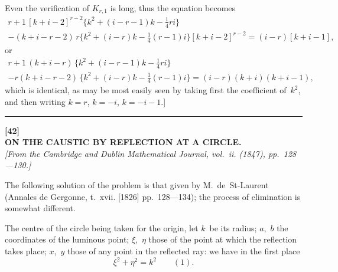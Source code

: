 \documentclass[11pt,a4paper]{book}
\begin{document}
Even the verification of $K_{r,1}$ is long, thus the equation becomes
\begin{multline*}
r+1 \, [k+i-2]^{r-2} \{k^2 + (i-r-1)k - \tfrac{1}{4}ri\} \\
- (k+i-r-2)\,r\{k^2 + (i-r)k - \tfrac{1}{4}(r-1)i\}[k+i-2]^{r-2} = (i-r)[k+i-1],
\end{multline*}
or
\begin{multline*}
r+1 \, (k+i-r)\,\{k^2 + (i-r-1)k - \tfrac{1}{4}ri\} \\
- r(k+i-r-2)\,\{k^2 + (i-r)k - \tfrac{1}{4}(r-1)i\} = (i-r)(k+i)(k+i-1),
\end{multline*}
which is identical, as may be most easily seen by taking first the coefficient of~$k^2$, and then writing $k=r$, $k=-i$, $k=-i-1$.]
\normalsize

\vspace{20pt}
\begin{center}
\rule{0.5\textwidth}{0.4pt}
\end{center}


\newpage
\begin{center}
\textbf{[42]}\\[4pt]
\textbf{\large ON THE CAUSTIC BY REFLECTION AT A CIRCLE.}\\[4pt]
\textit{[From the Cambridge and Dublin Mathematical Journal, vol.~ii. (1847), pp.~128---130.]}
\end{center}

\vspace{6pt}

The following solution of the problem is that given by M.~de~St-Laurent (Annales de Gergonne, t.~xvii. [1826] pp.~128---134); the process of elimination is somewhat different.

The centre of the circle being taken for the origin, let $k$~be its radius; $a$,~$b$ the coordinates of the luminous point; $\xi$,~$\eta$ those of the point at which the reflection takes place; $x$,~$y$ those of any point in the reflected ray: we have in the first place
\[
\xi^2 + \eta^2 = k^2 \qquad(1).
\]
\end{document}
